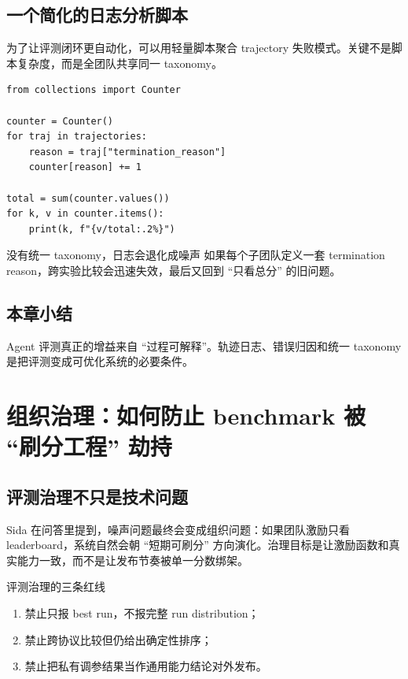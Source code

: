 \documentclass[a4paper]{article}
\begin{document}
\subsection{一个简化的日志分析脚本}
为了让评测闭环更自动化，可以用轻量脚本聚合 trajectory 失败模式。关键不是脚本复杂度，而是全团队共享同一 taxonomy。

\begin{lstlisting}[caption={聚合 Agent 失败模式的最小示例}]
from collections import Counter

counter = Counter()
for traj in trajectories:
    reason = traj["termination_reason"]
    counter[reason] += 1

total = sum(counter.values())
for k, v in counter.items():
    print(k, f"{v/total:.2%}")
\end{lstlisting}

\begin{warningbox}{没有统一 taxonomy，日志会退化成噪声}
如果每个子团队定义一套 termination reason，跨实验比较会迅速失效，最后又回到 ``只看总分'' 的旧问题。
\end{warningbox}

\subsection{本章小结}
Agent 评测真正的增益来自 ``过程可解释''。轨迹日志、错误归因和统一 taxonomy 是把评测变成可优化系统的必要条件。

\section{组织治理：如何防止 benchmark 被 ``刷分工程'' 劫持}

\subsection{评测治理不只是技术问题}
Sida 在问答里提到，噪声问题最终会变成组织问题：如果团队激励只看 leaderboard，系统自然会朝 ``短期可刷分'' 方向演化。治理目标是让激励函数和真实能力一致，而不是让发布节奏被单一分数绑架。

\begin{importantbox}{评测治理的三条红线}
\begin{enumerate}
    \item 禁止只报 best run，不报完整 run distribution；
    \item 禁止跨协议比较但仍给出确定性排序；
    \item 禁止把私有调参结果当作通用能力结论对外发布。
\end{enumerate}
\end{importantbox}
\end{document}

